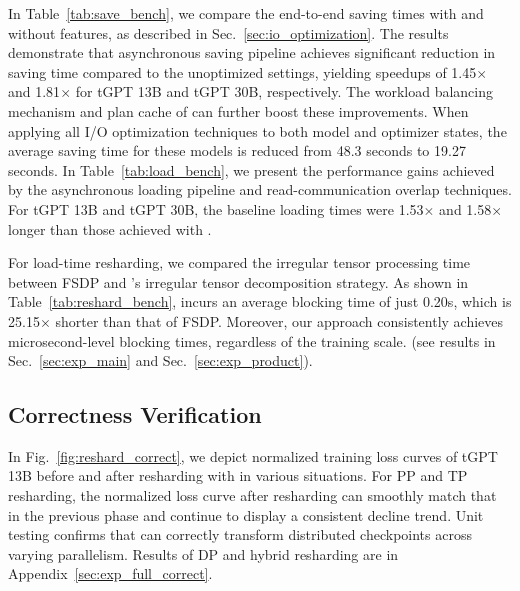 In Table~\ref{tab:save_bench}, we compare the end-to-end saving times with and without \sys{} features, as described in Sec.~\ref{sec:io_optimization}.
The results demonstrate that asynchronous saving pipeline achieves significant reduction in saving time compared to the unoptimized settings, yielding speedups of 1.45$\times$ and 1.81$\times$ for tGPT 13B and tGPT 30B, respectively.
The workload balancing mechanism and plan cache of \sys{} can further boost these improvements.
When applying all I/O optimization techniques to both model and optimizer states, the average saving time for these models is reduced from 48.3 seconds to 19.27 seconds.
In Table~\ref{tab:load_bench}, we present the performance gains achieved by the asynchronous loading pipeline and read-communication overlap techniques.
For tGPT 13B and tGPT 30B, the baseline loading times were 1.53$\times$ and 1.58$\times$ longer than those achieved with \sys{}.

For load-time resharding, we compared the irregular tensor processing time between FSDP and \sys{}'s irregular tensor decomposition strategy. As shown in Table~\ref{tab:reshard_bench}, \sys{} incurs an average blocking time of just 0.20s, which is 25.15$\times$ shorter 
than that of FSDP.
Moreover, our approach consistently achieves microsecond-level blocking times, regardless of the training scale. (see results in Sec.~\ref{sec:exp_main} and Sec.~\ref{sec:exp_product}).


\subsection{Correctness Verification}
\label{sec:exp_correct}

In Fig.~\ref{fig:reshard_correct}, we depict normalized training loss curves of tGPT 13B before and after resharding with \sys{} in various situations.
For PP and TP resharding, the normalized loss curve after resharding can smoothly match that in the previous phase and continue to display a consistent decline trend.
Unit testing confirms that \sys{} can correctly transform distributed checkpoints across varying parallelism.
Results of DP and hybrid resharding are in Appendix~\ref{sec:exp_full_correct}.

